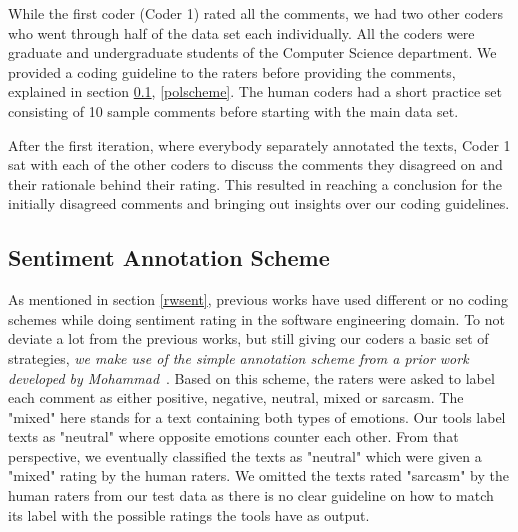 While the first coder (Coder 1) rated all the comments, 
we had two other coders 
who went through half of the data set each individually. 
All the coders were graduate and undergraduate students 
of the Computer Science department. 
We provided a coding guideline 
to the raters before providing the comments, 
explained in section \ref{sentscheme}, \ref{polscheme}. 
The human coders had a short practice set 
consisting of 10 sample comments 
before starting with the main data set.

After the first iteration, 
where everybody separately annotated the texts, 
Coder 1 sat with each of the other coders 
to discuss the comments they disagreed on 
and their rationale behind their rating. 
This resulted in reaching a conclusion 
for the initially disagreed comments 
and bringing out insights over our coding guidelines.

\subsection{Sentiment Annotation Scheme}\label{sentscheme}


As mentioned in section \ref{rwsent}, 
previous works have used different or no coding schemes 
while doing sentiment rating in the software engineering domain. 
To not deviate a lot from the previous works, 
but still giving our coders a basic set of strategies, 
\textit{we make use of the simple annotation scheme 
from a prior work developed by Mohammad}~\cite{mohammad2016practical}. 
Based on this scheme, 
the raters were asked to label each comment as 
either positive, negative, neutral, mixed or sarcasm. 
The "mixed" here stands for a text containing both types of emotions. Our tools label texts as "neutral" 
where opposite emotions counter each other. 
From that perspective, 
we eventually classified the texts as "neutral" 
which were given a "mixed" rating by the human raters. 
We omitted the texts rated "sarcasm" by the human raters 
from our test data as there is no clear guideline 
on how to match its label with the 
possible ratings the tools have as output. 

